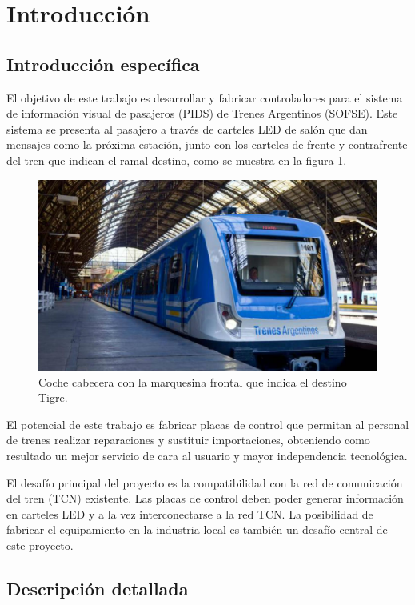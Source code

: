 \documentclass[
11pt, %
]{charter}
\begin{document}
\pagebreak


\section{Introducción}
\label{sec:intro}
\subsection{Introducción específica}
El objetivo de este trabajo es desarrollar y fabricar controladores para el sistema de información visual de pasajeros (PIDS) de Trenes Argentinos (SOFSE). Este sistema se presenta al pasajero a través de carteles LED de salón que dan mensajes como la próxima estación, junto con los carteles de frente y contrafrente del tren que indican el ramal destino, como se muestra en la figura 1. 

\begin{figure}[htpb]
\centering 
\includegraphics[width=.75\textwidth]{./Pics/tren.jpg}
\caption{Coche cabecera con la marquesina frontal que indica el destino Tigre.}
\label{fig:cartelFrente}
\end{figure}

El potencial de este trabajo es fabricar placas de control que permitan al personal de trenes realizar reparaciones y sustituir importaciones, obteniendo como resultado un mejor servicio de cara al usuario y mayor independencia tecnológica.

El desafío principal del proyecto es la compatibilidad con la red de comunicación del tren (TCN) existente. Las placas de control deben poder generar información en carteles LED y a la vez interconectarse a la red TCN. La posibilidad de fabricar el equipamiento en la industria local es también un desafío central de este proyecto.

\subsection{Descripción detallada}
\end{document}
